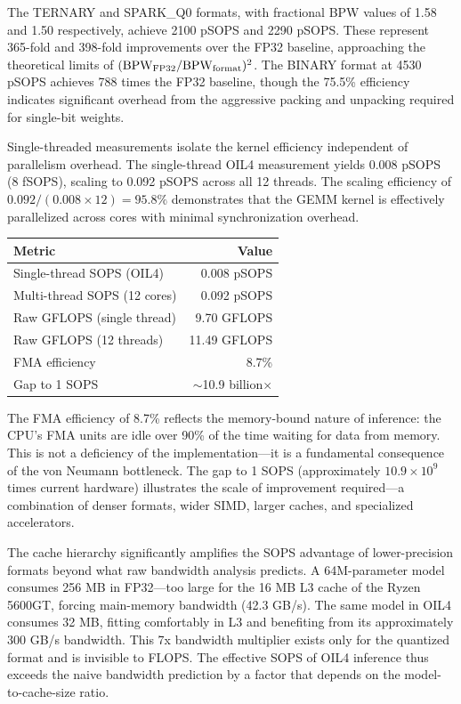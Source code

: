 The TERNARY and SPARK\_Q0 formats, with fractional BPW values of 1.58 and 1.50 respectively, achieve 2100 pSOPS and 2290 pSOPS. These represent 365-fold and 398-fold improvements over the FP32 baseline, approaching the theoretical limits of $(\textnormal{BPW}_{\text{FP32}} / \textnormal{BPW}_{\text{format}})^2$. The BINARY format at 4530 pSOPS achieves 788 times the FP32 baseline, though the 75.5\% efficiency indicates significant overhead from the aggressive packing and unpacking required for single-bit weights.

Single-threaded measurements isolate the kernel efficiency independent of parallelism overhead. The single-thread OIL4 measurement yields 0.008 pSOPS (8 fSOPS), scaling to 0.092 pSOPS across all 12 threads. The scaling efficiency of $0.092 / (0.008 \times 12) = 95.8\%$ demonstrates that the GEMM kernel is effectively parallelized across cores with minimal synchronization overhead.

\begin{center}
\tablestyle
\begin{tabular}{lr}
\toprule
\textbf{Metric} & \textbf{Value} \\
\midrule
Single-thread SOPS (OIL4) & 0.008 pSOPS \\
Multi-thread SOPS (12 cores) & 0.092 pSOPS \\
Raw GFLOPS (single thread) & 9.70 GFLOPS \\
Raw GFLOPS (12 threads) & 11.49 GFLOPS \\
FMA efficiency & 8.7\% \\
Gap to 1 SOPS & $\sim$10.9 billion$\times$ \\
\bottomrule
\end{tabular}
\end{center}

The FMA efficiency of 8.7\% reflects the memory-bound nature of inference: the CPU's FMA units are idle over 90\% of the time waiting for data from memory. This is not a deficiency of the implementation---it is a fundamental consequence of the von Neumann bottleneck. The gap to 1 SOPS (approximately $10.9 \times 10^9$ times current hardware) illustrates the scale of improvement required---a combination of denser formats, wider SIMD, larger caches, and specialized accelerators.

The cache hierarchy significantly amplifies the SOPS advantage of lower-precision formats beyond what raw bandwidth analysis predicts. A 64M-parameter model consumes 256 MB in FP32---too large for the 16 MB L3 cache of the Ryzen 5600GT, forcing main-memory bandwidth (42.3 GB/s). The same model in OIL4 consumes 32 MB, fitting comfortably in L3 and benefiting from its approximately 300 GB/s bandwidth. This 7x bandwidth multiplier exists only for the quantized format and is invisible to FLOPS. The effective SOPS of OIL4 inference thus exceeds the naive bandwidth prediction by a factor that depends on the model-to-cache-size ratio.

